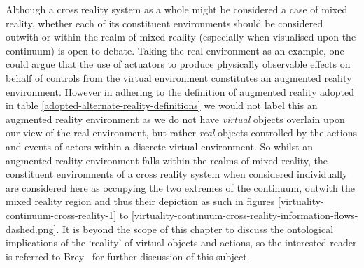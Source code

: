 Although a cross reality system as a whole might be considered a case of mixed reality, whether each of its constituent environments should be considered outwith or within the realm of mixed reality (especially when visualised upon the continuum) is open to debate. Taking the real environment as an example, one could argue that the use of actuators to produce physically observable effects on behalf of controls from the virtual environment constitutes an augmented reality environment. However in adhering to the definition of augmented reality adopted in table \ref{adopted-alternate-reality-definitions} we would not label this an augmented reality environment as we do not have \textit{virtual} objects overlain upon our view of the real environment, but rather \textit{real} objects controlled by the actions and events of actors within a discrete virtual environment. So whilst an augmented reality environment falls within the realms of mixed reality, the constituent environments of a cross reality system when considered individually are considered here as occupying the two extremes of the continuum, outwith the mixed reality region and thus their depiction as such in figures \ref{virtuality-continuum-cross-reality-1} to \ref{virtuality-continuum-cross-reality-information-flows-dashed.png}. It is beyond the scope of this chapter to discuss the ontological implications of the `reality' of virtual objects and actions, so the interested reader is referred to Brey~\cite{Brey2014} for further discussion of this subject.



